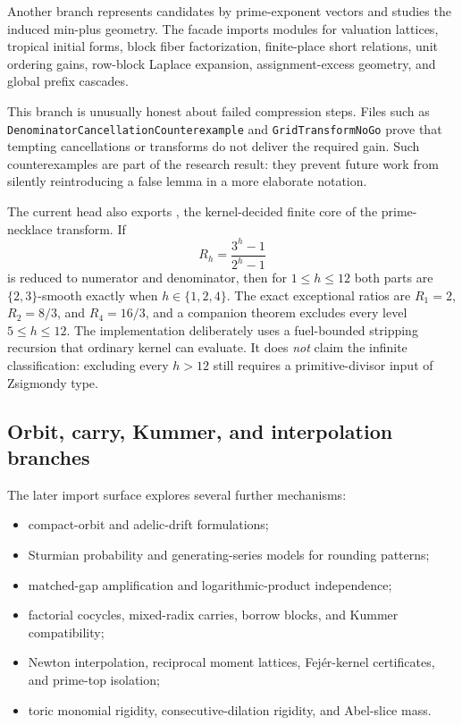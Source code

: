 \documentclass[
  10pt,
  a4paper,
  twoside,
  open=any,
  parskip=half,
  headings=big
]{scrreprt}
\newcommand{\code}[1]{\texttt{\detokenize{#1}}}
\newcommand{\breakcode}[1]{{\ttfamily\nolinkurl{#1}}}
\begin{document}
Another branch represents candidates by prime-exponent vectors and studies the induced min-plus geometry. The facade imports modules for valuation lattices, tropical initial forms, block fiber factorization, finite-place short relations, unit ordering gains, row-block Laplace expansion, assignment-excess geometry, and global prefix cascades.

This branch is unusually honest about failed compression steps. Files such as \breakcode{DenominatorCancellationCounterexample} and \breakcode{GridTransformNoGo} prove that tempting cancellations or transforms do not deliver the required gain. Such counterexamples are part of the research result: they prevent future work from silently reintroducing a false lemma in a more elaborate notation.

The current head also exports \code{SmoothLevelClassification}, the kernel-decided finite core of the prime-necklace transform. If
\[
R_h=\frac{3^h-1}{2^h-1}
\]
is reduced to numerator and denominator, then for \(1\leq h\leq12\) both parts are \(\{2,3\}\)-smooth exactly when \(h\in\{1,2,4\}\). The exact exceptional ratios are \(R_1=2\), \(R_2=8/3\), and \(R_4=16/3\), and a companion theorem excludes every level \(5\leq h\leq12\). The implementation deliberately uses a fuel-bounded stripping recursion that ordinary kernel \code{decide} can evaluate. It does \emph{not} claim the infinite classification: excluding every \(h>12\) still requires a primitive-divisor input of Zsigmondy type.

\subsection{Orbit, carry, Kummer, and interpolation branches}

The later import surface explores several further mechanisms:

\begin{itemize}
  \item compact-orbit and adelic-drift formulations;
  \item Sturmian probability and generating-series models for rounding patterns;
  \item matched-gap amplification and logarithmic-product independence;
  \item factorial cocycles, mixed-radix carries, borrow blocks, and Kummer compatibility;
  \item Newton interpolation, reciprocal moment lattices, Fej\'er-kernel certificates, and prime-top isolation;
  \item toric monomial rigidity, consecutive-dilation rigidity, and Abel-slice mass.
\end{itemize}
\end{document}
